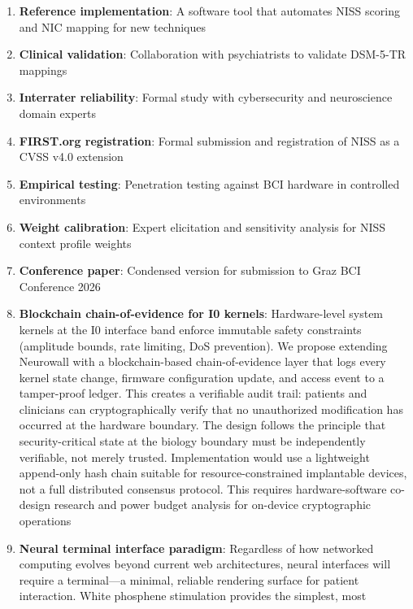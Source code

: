 \begin{enumerate}
  \item \textbf{Reference implementation}: A software tool that automates NISS
        scoring and NIC mapping for new techniques
  \item \textbf{Clinical validation}: Collaboration with psychiatrists to
        validate DSM-5-TR mappings
  \item \textbf{Interrater reliability}: Formal study with cybersecurity and
        neuroscience domain experts
  \item \textbf{FIRST.org registration}: Formal submission and registration of
        NISS as a CVSS v4.0 extension
  \item \textbf{Empirical testing}: Penetration testing against BCI hardware in
        controlled environments
  \item \textbf{Weight calibration}: Expert elicitation and sensitivity analysis
        for NISS context profile weights
  \item \textbf{Conference paper}: Condensed version for submission to Graz BCI
        Conference 2026
  \item \textbf{Blockchain chain-of-evidence for I0 kernels}: Hardware-level
        system kernels at the I0 interface band enforce immutable safety constraints
        (amplitude bounds, rate limiting, DoS prevention). We propose extending
        Neurowall with a blockchain-based chain-of-evidence layer that logs every
        kernel state change, firmware configuration update, and access event to a
        tamper-proof ledger. This creates a verifiable audit trail: patients and
        clinicians can cryptographically verify that no unauthorized modification
        has occurred at the hardware boundary. The design follows the principle that
        security-critical state at the biology boundary must be independently
        verifiable, not merely trusted. Implementation would use a lightweight
        append-only hash chain suitable for resource-constrained implantable
        devices, not a full distributed consensus protocol. This requires
        hardware-software co-design research and power budget analysis for
        on-device cryptographic operations
  \item \textbf{Neural terminal interface paradigm}: Regardless of how networked
        computing evolves beyond current web architectures, neural interfaces will
        require a terminal---a minimal, reliable rendering surface for patient
        interaction. White phosphene stimulation provides the simplest, most

\end{enumerate}
